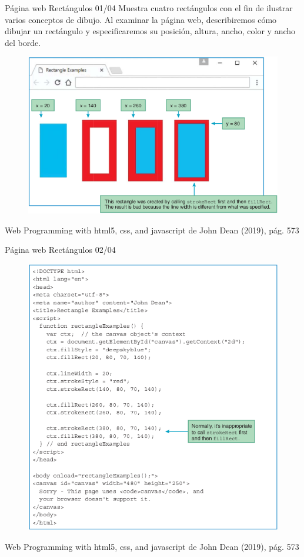 \begin{frame}{Página web Rectángulos 01/04}
\justifying
Muestra cuatro rectángulos con el fin de ilustrar varios conceptos de dibujo. Al examinar la página web, describiremos cómo dibujar un rectángulo y especificaremos su posición, altura, ancho, color y ancho del borde.

\begin{figure}[H]
\centering
\includegraphics[scale=0.3]{Section_Files/images/Sec01/03.png}
\end{figure}

{\tiny Web Programming with html5, css, and javascript de John Dean (2019), pág. 573}
\end{frame}

\begin{frame}{Página web Rectángulos 02/04}
\justifying
\begin{figure}[H]
\centering
\includegraphics[scale=0.3]{Section_Files/images/Sec01/04.png}
\end{figure}

{\tiny Web Programming with html5, css, and javascript de John Dean (2019), pág. 573}
\end{frame}

